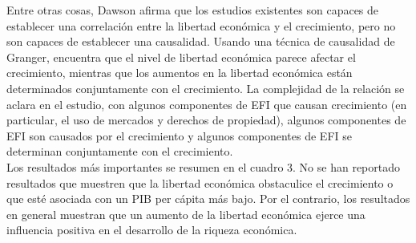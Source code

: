     Entre otras cosas, Dawson afirma que los estudios existentes son capaces de establecer una correlación entre la libertad económica y el crecimiento, pero no son capaces de establecer una causalidad. Usando una técnica de causalidad de Granger, encuentra que el nivel de libertad económica parece afectar el crecimiento, mientras que los aumentos en la libertad económica están determinados conjuntamente con el crecimiento. La complejidad de la relación se aclara en el estudio, con algunos componentes de EFI que causan crecimiento (en particular, el uso de mercados y derechos de propiedad), algunos componentes de EFI son causados por el crecimiento y algunos componentes de EFI se determinan conjuntamente con el crecimiento. \\
    Los resultados más importantes se resumen en el cuadro 3. No se han reportado resultados que muestren que la libertad económica obstaculice el crecimiento o que esté asociada con un PIB per cápita más bajo. Por el contrario, los resultados en general muestran que un aumento de la libertad económica ejerce una influencia positiva en el desarrollo de la riqueza económica.\\

